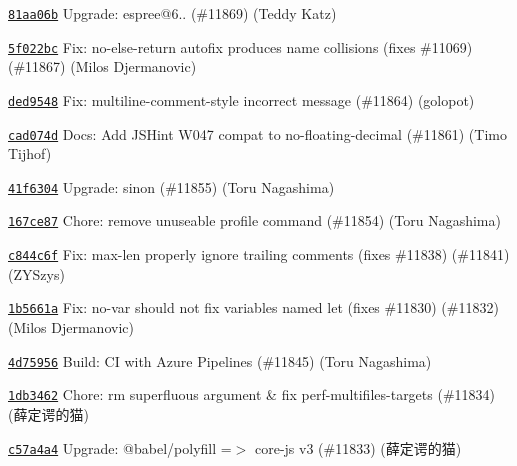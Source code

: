 \begin{DoxyItemize}
\item \href{https://github.com/eslint/eslint/commit/81aa06b4cc49e9c15234a2c4d27659a03fea53d8}{\texttt{ {\ttfamily 81aa06b}}} Upgrade\+: espree@6.. (\#11869) (Teddy Katz)
\item \href{https://github.com/eslint/eslint/commit/5f022bc91d0d93d140876ceb1ee4e08b1b7cfd49}{\texttt{ {\ttfamily 5f022bc}}} Fix\+: no-\/else-\/return autofix produces name collisions (fixes \#11069) (\#11867) (Milos Djermanovic)
\item \href{https://github.com/eslint/eslint/commit/ded9548d881b15e771ca79b844e8159601f30f70}{\texttt{ {\ttfamily ded9548}}} Fix\+: multiline-\/comment-\/style incorrect message (\#11864) (golopot)
\item \href{https://github.com/eslint/eslint/commit/cad074d4ddb34a59183b5965ca50170713b5a711}{\texttt{ {\ttfamily cad074d}}} Docs\+: Add J\+S\+Hint W047 compat to no-\/floating-\/decimal (\#11861) (Timo Tijhof)
\item \href{https://github.com/eslint/eslint/commit/41f6304ce641a82ee729251b448dceb9fb0d501d}{\texttt{ {\ttfamily 41f6304}}} Upgrade\+: sinon (\#11855) (Toru Nagashima)
\item \href{https://github.com/eslint/eslint/commit/167ce87e908ec04b0d3d79960278d45c883c4285}{\texttt{ {\ttfamily 167ce87}}} Chore\+: remove unuseable profile command (\#11854) (Toru Nagashima)
\item \href{https://github.com/eslint/eslint/commit/c844c6f2ff314cfa8c6ca0e35a1ef58b7e297b79}{\texttt{ {\ttfamily c844c6f}}} Fix\+: max-\/len properly ignore trailing comments (fixes \#11838) (\#11841) (Z\+Y\+Szys)
\item \href{https://github.com/eslint/eslint/commit/1b5661ae467c227c0239e06cc1466480004aa799}{\texttt{ {\ttfamily 1b5661a}}} Fix\+: no-\/var should not fix variables named \textquotesingle{}let\textquotesingle{} (fixes \#11830) (\#11832) (Milos Djermanovic)
\item \href{https://github.com/eslint/eslint/commit/4d75956147b6fd662ee90eb21d3f762816463b88}{\texttt{ {\ttfamily 4d75956}}} Build\+: CI with Azure Pipelines (\#11845) (Toru Nagashima)
\item \href{https://github.com/eslint/eslint/commit/1db346220889305a427b45a00afcf362b81b3767}{\texttt{ {\ttfamily 1db3462}}} Chore\+: rm superfluous argument \& fix perf-\/multifiles-\/targets (\#11834) (薛定谔的猫)
\item \href{https://github.com/eslint/eslint/commit/c57a4a4a993193c4208c6419df331a7bc644a536}{\texttt{ {\ttfamily c57a4a4}}} Upgrade\+: @babel/polyfill =$>$ core-\/js v3 (\#11833) (薛定谔的猫)

\end{DoxyItemize}
